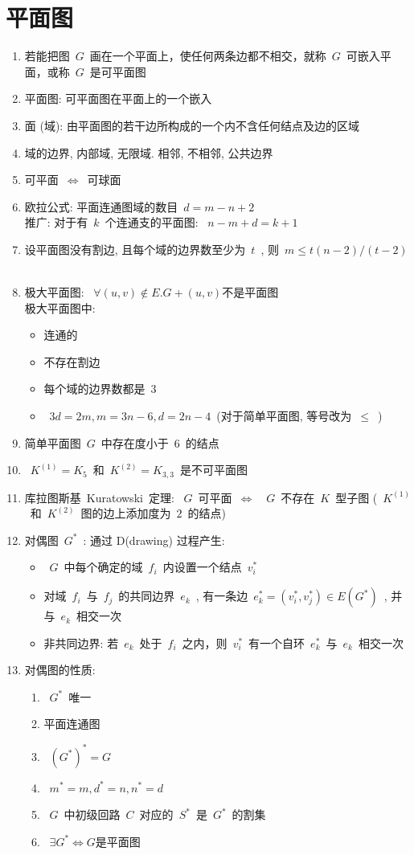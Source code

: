 \documentclass[11pt,a4paper]{article}%
\renewcommand{\[}{~$}
\renewcommand{\]}{$~}%
\begin{document}
\section{平面图}
	\begin{enumerate}
	 \item 若能把图\[G\]画在一个平面上，使任何两条边都不相交，就称\[G\]可嵌入平面，或称\[G\]是可平面图
	 \item 平面图: 可平面图在平面上的一个嵌入
	 \item 面 (域): 由平面图的若干边所构成的一个内不含任何结点及边的区域
	 \item 域的边界, 内部域, 无限域. 相邻, 不相邻, 公共边界
	 \item 可平面\[\Leftrightarrow\]可球面
	 \item 欧拉公式: 平面连通图域的数目\[d = m-n+2\]\\
	 	推广: 对于有\[k\]个连通支的平面图: \[n-m+d = k+1\]
	 \item 设平面图没有割边, 且每个域的边界数至少为\[t\], 则\[m \le t(n-2)/(t-2)\]
	 \item 极大平面图: \[\forall (u,v)\notin E. G+(u,v)\mbox{不是平面图}\]\\
	 极大平面图中:
	 	\begin{itemize}
	 	 \item 连通的
	 	 \item 不存在割边
	 	 \item 每个域的边界数都是\[3\]
	 	 \item \[3d=2m, m=3n-6, d=2n-4\](对于简单平面图, 等号改为\[\le\])
	 	\end{itemize}
	 \item 简单平面图\[G\]中存在度小于\[6\]的结点
	 \item \[K^{(1)} = K_5\]和\[K^{(2)} = K_{3,3}\]是不可平面图
	 \item 库拉图斯基~Kuratowski~定理: \[G\]可平面\[\Leftrightarrow\]\[G\]不存在\[K\]型子图 (\[K^{(1)}\]和\[K^{(2)}\]图的边上添加度为\[2\]的结点)
	 \item 对偶图\[G^*\]: 通过 D(drawing) 过程产生:
	 	\begin{itemize}
	 	 \item \[G\]中每个确定的域\[f_i\]内设置一个结点\[v_i^*\]
	 	 \item 对域\[f_i\]与\[f_j\]的共同边界\[e_k\], 有一条边\[e_k^* = (v_i^*,v_j^*) \in E(G^*)\], 并与\[e_k\]相交一次
	 	 \item 非共同边界: 若\[e_k\]处于\[f_i\]之内，则\[v_i^*\]有一个自环\[e_k^*\]与\[e_k\]相交一次
	 	\end{itemize}
	 \item 对偶图的性质:
	 	\begin{enumerate}
	 	 \item \[G^*\]唯一
	 	 \item 平面连通图
	 	 \item \[(G^*)^* = G\]
	 	 \item \[m^* = m, d^* = n, n^* = d\]
	 	 \item \[G\]中初级回路\[C\]对应的\[S^*\]是\[G^*\]的割集
	 	 \item \[\exists G^* \Leftrightarrow G\mbox{是平面图}\]
	 	\end{enumerate}
	\end{enumerate}
	
\end{document}
